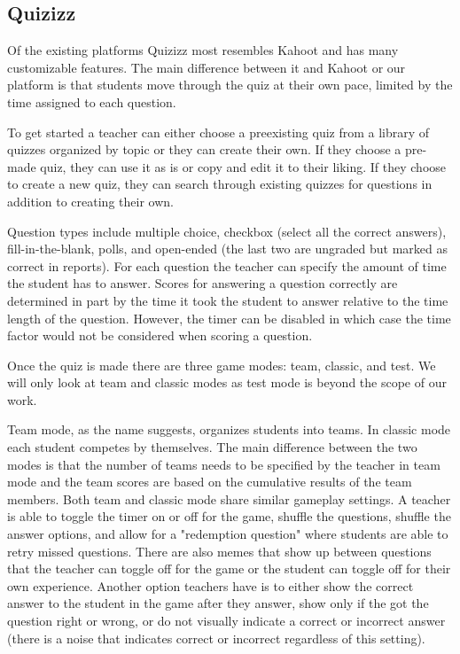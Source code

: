 \documentclass{article}
\begin{document}
\subsection{Quizizz}
Of the existing platforms Quizizz most resembles Kahoot and has many customizable features. The main difference between it and Kahoot or our platform is that students move through the quiz at their own pace, limited by the time assigned to each question.

To get started a teacher can either choose a preexisting quiz from a library of quizzes organized by topic or they can create their own. If they choose a pre-made quiz, they can use it as is or copy and edit it to their liking. If they choose to create a new quiz, they can search through existing quizzes for questions in addition to creating their own.

Question types include multiple choice, checkbox (select all the correct answers), fill-in-the-blank, polls, and open-ended (the last two are ungraded but marked as correct in reports). For each question the teacher can specify the amount of time the student has to answer. Scores for answering a question correctly are determined in part by the time it took the student to answer relative to the time length of the question. However, the timer can be disabled in which case the time factor would not be considered when scoring a question.

Once the quiz is made there are three game modes: team, classic, and test. We will only look at team and classic modes as test mode is beyond the scope of our work.

Team mode, as the name suggests, organizes students into teams. In classic mode each student competes by themselves. The main difference between the two modes is that the number of teams needs to be specified by the teacher in team mode and the team scores are based on the cumulative results of the team members. Both team and classic mode share similar gameplay settings. A teacher is able to toggle the timer on or off for the game, shuffle the questions, shuffle the answer options, and allow for a "redemption question" where students are able to retry missed questions. There are also memes that show up between questions that the teacher can toggle off for the game or the student can toggle off for their own experience. Another option teachers have is to either show the correct answer to the student in the game after they answer, show only if the got the question right or wrong, or do not visually indicate a correct or incorrect answer (there is a noise that indicates correct or incorrect regardless of this setting).
\end{document}
